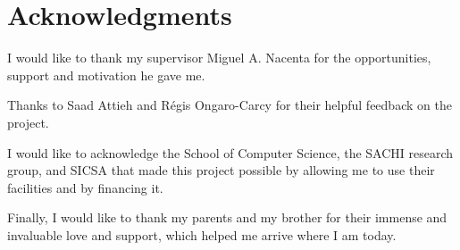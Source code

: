 \section{Acknowledgments}
I would like to thank my supervisor Miguel A. Nacenta for the opportunities, support and motivation he gave me. 

\par Thanks to Saad Attieh and Régis Ongaro-Carcy for their helpful feedback on the project.

\par I would like to acknowledge the School of Computer Science, the SACHI research group, and SICSA that made this project possible by allowing me to use their facilities and by financing it. 

\par Finally, I would like to thank my parents and my brother for their immense and invaluable love and support, which helped me arrive where I am today. 